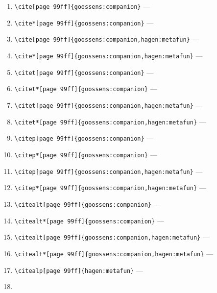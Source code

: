 \documentclass[12pt]{article}
\begin{document}
\begin{enumerate}
\item
\verb|\cite[page 99ff]{goossens:companion}| --- 
\cite[page 99ff]{goossens:companion}
\item
\verb|\cite*[page 99ff]{goossens:companion}| --- 
\cite*[page 99ff]{goossens:companion}
\item
\verb|\cite[page 99ff]{goossens:companion,hagen:metafun}| --- 
\cite[page 99ff]{goossens:companion,hagen:metafun}
\item
\verb|\cite*[page 99ff]{goossens:companion,hagen:metafun}| --- 
\cite*[page 99ff]{goossens:companion,hagen:metafun}
\item
\verb|\citet[page 99ff]{goossens:companion}| --- 
\citet[page 99ff]{goossens:companion}
\item
\verb|\citet*[page 99ff]{goossens:companion}| --- 
\citet*[page 99ff]{goossens:companion}
\item
\verb|\citet[page 99ff]{goossens:companion,hagen:metafun}| --- 
\citet[page 99ff]{goossens:companion,hagen:metafun}
\item
\verb|\citet*[page 99ff]{goossens:companion,hagen:metafun}| --- 
\citet*[page 99ff]{goossens:companion,hagen:metafun}
\item
\verb|\citep[page 99ff]{goossens:companion}| --- 
\citep[page 99ff]{goossens:companion}
\item
\verb|\citep*[page 99ff]{goossens:companion}| --- 
\citep*[page 99ff]{goossens:companion}
\item
\verb|\citep[page 99ff]{goossens:companion,hagen:metafun}| --- 
\citep[page 99ff]{goossens:companion,hagen:metafun}
\item
\verb|\citep*[page 99ff]{goossens:companion,hagen:metafun}| --- 
\citep*[page 99ff]{goossens:companion,hagen:metafun}
\item
\verb|\citealt[page 99ff]{goossens:companion}| --- 
\citealt[page 99ff]{goossens:companion}
\item
\verb|\citealt*[page 99ff]{goossens:companion}| --- 
\citealt*[page 99ff]{goossens:companion}
\item
\verb|\citealt[page 99ff]{goossens:companion,hagen:metafun}| --- 
\citealt[page 99ff]{goossens:companion,hagen:metafun}
\item
\verb|\citealt*[page 99ff]{goossens:companion,hagen:metafun}| --- 
\citealt*[page 99ff]{goossens:companion,hagen:metafun}
\item
\verb|\citealp[page 99ff]{hagen:metafun}| --- 
\citealp[page 99ff]{hagen:metafun}
\item

\end{enumerate}
\end{document}
